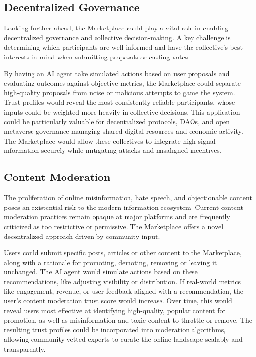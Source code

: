\documentclass{article}
\begin{document}
\subsection{Decentralized Governance}
Looking further ahead, the Marketplace could play a vital role in enabling decentralized governance and collective decision-making. A key challenge is determining which participants are well-informed and have the collective's best interests in mind when submitting proposals or casting votes.

By having an AI agent take simulated actions based on user proposals and evaluating outcomes against objective metrics, the Marketplace could separate high-quality proposals from noise or malicious attempts to game the system. Trust profiles would reveal the most consistently reliable participants, whose inputs could be weighted more heavily in collective decisions. This application could be particularly valuable for decentralized protocols, DAOs, and open metaverse governance managing shared digital resources and economic activity. The Marketplace would allow these collectives to integrate high-signal information securely while mitigating attacks and misaligned incentives.

\subsection{Content Moderation}
The proliferation of online misinformation, hate speech, and objectionable content poses an existential risk to the modern information ecosystem. Current content moderation practices remain opaque at major platforms and are frequently criticized as too restrictive or permissive. The Marketplace offers a novel, decentralized approach driven by community input.

Users could submit specific posts, articles or other content to the Marketplace, along with a rationale for promoting, demoting, removing or leaving it unchanged. The AI agent would simulate actions based on these recommendations, like adjusting visibility or distribution. If real-world metrics like engagement, revenue, or user feedback aligned with a recommendation, the user's content moderation trust score would increase. Over time, this would reveal users most effective at identifying high-quality, popular content for promotion, as well as misinformation and toxic content to throttle or remove. The resulting trust profiles could be incorporated into moderation algorithms, allowing community-vetted experts to curate the online landscape scalably and transparently.
\end{document}
